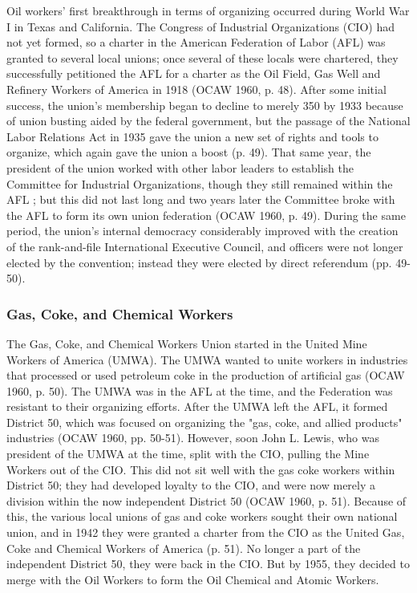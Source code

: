 \documentclass[12pt]{article}
\begin{document}
Oil workers’ first breakthrough in terms of organizing occurred during World War I in Texas and California. The Congress of Industrial Organizations (CIO) had not yet formed, so a charter in the American Federation of Labor (AFL) was granted to several local unions; once several of these locals were chartered, they successfully petitioned the AFL for a charter as the Oil Field, Gas Well and Refinery Workers of America in 1918 (OCAW 1960, p. 48). After some initial success, the union’s membership began to decline to merely 350 by 1933 because of union busting aided by the federal government, but the passage of the National Labor Relations Act in 1935 gave the union a new set of rights and tools to organize, which again gave the union a boost (p. 49). That same year, the president of the union worked with other labor leaders to establish the Committee for Industrial Organizations, though they still remained within the AFL ; but this did not last long and two years later the Committee broke with the AFL to form its own union federation (OCAW 1960, p. 49). During the same period, the union’s internal democracy considerably improved with the creation of the rank-and-file International Executive Council, and officers were not longer elected by the convention; instead they were elected by direct referendum (pp. 49-50).

\subsubsection{Gas, Coke, and Chemical Workers}

The Gas, Coke, and Chemical Workers Union started in the United Mine Workers of America (UMWA). The UMWA wanted to unite workers in industries that processed or used petroleum coke in the production of artificial gas (OCAW 1960, p. 50). The UMWA was in the AFL at the time, and the Federation was resistant to their organizing efforts. After the UMWA left the AFL, it formed District 50, which was focused on organizing the "gas, coke, and allied products" industries (OCAW 1960, pp. 50-51). However, soon John L. Lewis, who was president of the UMWA at the time, split with the CIO, pulling the Mine Workers out of the CIO. This did not sit well with the gas coke workers within District 50; they had developed loyalty to the CIO, and were now merely a division within the now independent District 50 (OCAW 1960, p. 51). Because of this, the various local unions of gas and coke workers sought their own national union, and in 1942 they were granted a charter from the CIO as the United Gas, Coke and Chemical Workers of America (p. 51). No longer a part of the independent District 50, they were back in the CIO.  But by 1955, they decided to merge with the Oil Workers to form the Oil Chemical and Atomic Workers.
\end{document}
